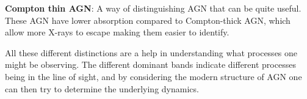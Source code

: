 \textbf{Compton thin AGN}: 
A way of distinguishing AGN that can be quite useful. These AGN have lower absorption compared to Compton-thick AGN, which allow more X-rays to escape making them easier to identify. 



All these different distinctions are a help in understanding what processes one might be observing. The different
dominant bands indicate different processes being in the line of sight, and by considering the modern structure of 
AGN one can then try to determine the underlying dynamics.  

 
